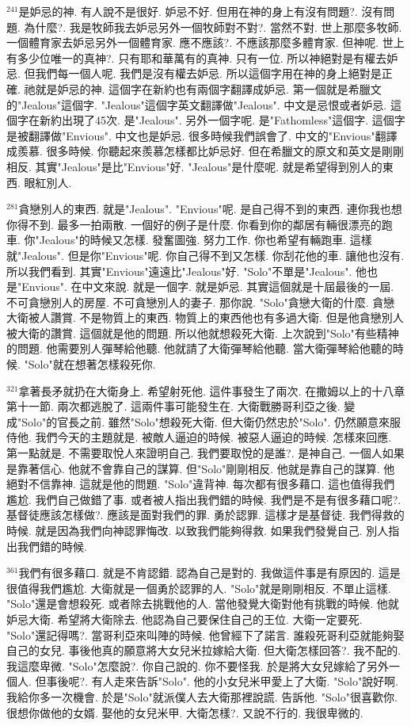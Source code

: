\documentclass{book}
\begin{document}
$^{241}$是妒忌的神.
有人說不是很好.
妒忌不好.
但用在神的身上有沒有問題?.
沒有問題.
為什麼?.
我是牧師我去妒忌另外一個牧師對不對?.
當然不對.
世上那麼多牧師.
一個體育家去妒忌另外一個體育家.
應不應該?.
不應該那麼多體育家.
但神呢.
世上有多少位唯一的真神?.
只有耶和華萬有的真神.
只有一位.
所以神絕對是有權去妒忌.
但我們每一個人呢.
我們是沒有權去妒忌.
所以這個字用在神的身上絕對是正確.
祂就是妒忌的神.
這個字在新約也有兩個字翻譯成妒忌.
第一個就是希臘文的"Jealous"這個字.
"Jealous"這個字英文翻譯做"Jealous".
中文是忌恨或者妒忌.
這個字在新約出現了45次.
是"Jealous".
另外一個字呢.
是"Fathomless"這個字.
這個字是被翻譯做"Envious".
中文也是妒忌.
很多時候我們誤會了.
中文的"Envious"翻譯成羨慕.
很多時候.
你聽起來羨慕怎樣都比妒忌好.
但在希臘文的原文和英文是剛剛相反.
其實"Jealous"是比"Envious"好.
"Jealous"是什麼呢.
就是希望得到別人的東西.
眼紅別人.

$^{281}$貪戀別人的東西.
就是"Jealous".
"Envious"呢.
是自己得不到的東西.
連你我也想你得不到.
最多一拍兩散.
一個好的例子是什麼.
你看到你的鄰居有輛很漂亮的跑車.
你"Jealous"的時候又怎樣.
發奮圖強.
努力工作.
你也希望有輛跑車.
這樣就"Jealous".
但是你"Envious"呢.
你自己得不到又怎樣.
你刮花他的車.
讓他也沒有.
所以我們看到.
其實"Envious"遠遠比"Jealous"好.
"Solo"不單是"Jealous".
他也是"Envious".
在中文來說.
就是一個字.
就是妒忌.
其實這個就是十屆最後的一屆.
不可貪戀別人的房屋.
不可貪戀別人的妻子.
那你說.
"Solo"貪戀大衛的什麼.
貪戀大衛被人讚賞.
不是物質上的東西.
物質上的東西他也有多過大衛.
但是他貪戀別人被大衛的讚賞.
這個就是他的問題.
所以他就想殺死大衛.
上次說到"Solo"有些精神的問題.
他需要別人彈琴給他聽.
他就請了大衛彈琴給他聽.
當大衛彈琴給他聽的時候.
"Solo"就在想著怎樣殺死你.

$^{321}$拿著長矛就扔在大衛身上.
希望射死他.
這件事發生了兩次.
在撒姆以上的十八章第十一節.
兩次都逃脫了.
這兩件事可能發生在.
大衛戰勝哥利亞之後.
變成"Solo"的官長之前.
雖然"Solo"想殺死大衛.
但大衛仍然忠於"Solo".
仍然願意來服侍他.
我們今天的主題就是.
被敵人逼迫的時候.
被惡人逼迫的時候.
怎樣來回應.
第一點就是.
不需要取悅人來證明自己.
我們要取悅的是誰?.
是神自己.
一個人如果是靠著信心.
他就不會靠自己的謀算.
但"Solo"剛剛相反.
他就是靠自己的謀算.
他絕對不信靠神.
這就是他的問題.
"Solo"違背神.
每次都有很多藉口.
這也值得我們尷尬.
我們自己做錯了事.
或者被人指出我們錯的時候.
我們是不是有很多藉口呢?.
基督徒應該怎樣做?.
應該是面對我們的罪.
勇於認罪.
這樣才是基督徒.
我們得救的時候.
就是因為我們向神認罪悔改.
以致我們能夠得救.
如果我們發覺自己.
別人指出我們錯的時候.

$^{361}$我們有很多藉口.
就是不肯認錯.
認為自己是對的.
我做這件事是有原因的.
這是很值得我們尷尬.
大衛就是一個勇於認罪的人.
"Solo"就是剛剛相反.
不單止這樣.
"Solo"還是會想殺死.
或者除去挑戰他的人.
當他發覺大衛對他有挑戰的時候.
他就妒忌大衛.
希望將大衛除去.
他認為自己要保住自己的王位.
大衛一定要死.
"Solo"還記得嗎?.
當哥利亞來叫陣的時候.
他曾經下了諾言.
誰殺死哥利亞就能夠娶自己的女兒.
事後他真的願意將大女兒米拉嫁給大衛.
但大衛怎樣回答?.
我不配的.
我這麼卑微.
"Solo"怎麼說?.
你自己說的.
你不要怪我.
於是將大女兒嫁給了另外一個人.
但事後呢?.
有人走來告訴"Solo".
他的小女兒米甲愛上了大衛.
"Solo"說好啊.
我給你多一次機會.
於是"Solo"就派僕人去大衛那裡說謊.
告訴他.
"Solo"很喜歡你.
很想你做他的女婿.
娶他的女兒米甲.
大衛怎樣?.
又說不行的.
我很卑微的.
\end{document}
